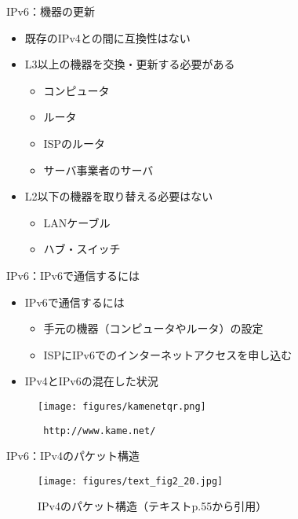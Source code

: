 \documentclass[12pt,aspectratio=169]{beamer}
\begin{document}
\begin{frame}{IPv6：機器の更新}

  \begin{itemize}
    \item 既存のIPv4との間に互換性はない %
    \item L3以上の機器を交換・更新する必要がある
    \begin{itemize}
      \item コンピュータ
      \item ルータ
      \item ISPのルータ
      \item サーバ事業者のサーバ
    \end{itemize}
    \item L2以下の機器を取り替える必要はない
    \begin{itemize}
      \item LANケーブル
      \item ハブ・スイッチ
    \end{itemize}
  \end{itemize}

\end{frame}

\begin{frame}{IPv6：IPv6で通信するには}

  \begin{itemize}
    \item IPv6で通信するには
    \begin{itemize}
      \item 手元の機器（コンピュータやルータ）の設定
      \item ISPにIPv6でのインターネットアクセスを申し込む
    \end{itemize}
    \item IPv4とIPv6の混在した状況 %
  \end{itemize}

  \centering
  \begin{figure}
    \centering
    \texttt{[image: figures/kamenetqr.png]}
    \label{fig:kamenetqr}
    \caption{\texttt{ http://www.kame.net/ }}
  \end{figure}

\end{frame}

\begin{frame}{IPv6：IPv4のパケット構造}

  \centering
  \begin{figure}
    \centering
    \texttt{[image: figures/text\_fig2\_20.jpg]}
    \label{fig:text_fig2_20}
    \caption{IPv4のパケット構造（テキストp.55から引用）}
  \end{figure}

\end{frame}
\end{document}

